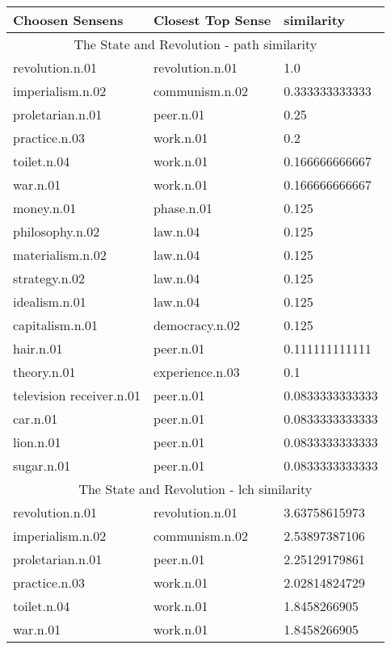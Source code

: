 
    \begin{center}
      \begin{tabular}{ | l | l | l |}
        \hline
        Choosen Sensens & Closest Top Sense & similarity  \\ \hline
\multicolumn{3}{|c|}{The State and Revolution - path similarity} \\ \hline
revolution.n.01 & revolution.n.01 & 1.0 \\ \hline
imperialism.n.02 & communism.n.02 & 0.333333333333 \\ \hline
proletarian.n.01 & peer.n.01 & 0.25 \\ \hline
practice.n.03 & work.n.01 & 0.2 \\ \hline
toilet.n.04 & work.n.01 & 0.166666666667 \\ \hline
war.n.01 & work.n.01 & 0.166666666667 \\ \hline
money.n.01 & phase.n.01 & 0.125 \\ \hline
philosophy.n.02 & law.n.04 & 0.125 \\ \hline
materialism.n.02 & law.n.04 & 0.125 \\ \hline
strategy.n.02 & law.n.04 & 0.125 \\ \hline
idealism.n.01 & law.n.04 & 0.125 \\ \hline
capitalism.n.01 & democracy.n.02 & 0.125 \\ \hline
hair.n.01 & peer.n.01 & 0.111111111111 \\ \hline
theory.n.01 & experience.n.03 & 0.1 \\ \hline
television receiver.n.01 & peer.n.01 & 0.0833333333333 \\ \hline
car.n.01 & peer.n.01 & 0.0833333333333 \\ \hline
lion.n.01 & peer.n.01 & 0.0833333333333 \\ \hline
sugar.n.01 & peer.n.01 & 0.0833333333333 \\ \hline
\multicolumn{3}{|c|}{The State and Revolution - lch similarity} \\ \hline
revolution.n.01 & revolution.n.01 & 3.63758615973 \\ \hline
imperialism.n.02 & communism.n.02 & 2.53897387106 \\ \hline
proletarian.n.01 & peer.n.01 & 2.25129179861 \\ \hline
practice.n.03 & work.n.01 & 2.02814824729 \\ \hline
toilet.n.04 & work.n.01 & 1.8458266905 \\ \hline
war.n.01 & work.n.01 & 1.8458266905 \\ \hline

\end{tabular}
\end{center}
